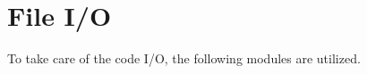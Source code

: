 %  
%  
%  
\section{File I/O}
%
To take care of the code I/O, the following modules are utilized.

